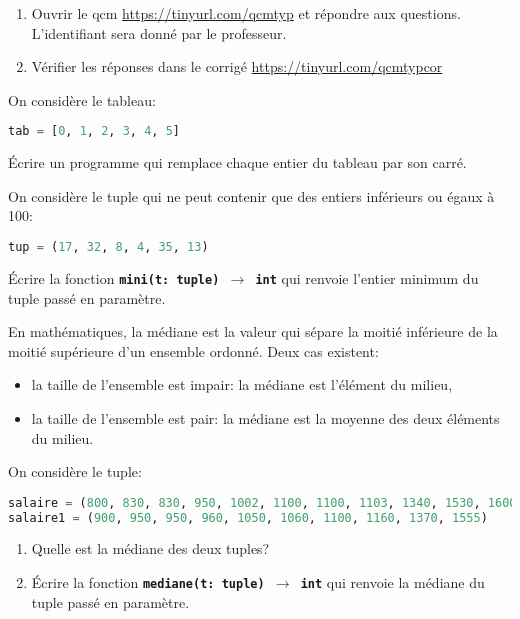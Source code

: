 \documentclass[a4paper,11pt]{article}
\begin{document}
\begin{exo}
\begin{enumerate}
    \item Ouvrir le qcm \url{https://tinyurl.com/qcmtyp} et répondre aux questions. L'identifiant sera donné par le professeur.
    \item Vérifier les réponses dans le corrigé \url{https://tinyurl.com/qcmtypcor}
\end{enumerate}
\end{exo}
\begin{exo}
    On considère le tableau:
    \begin{lstlisting}[language=Python  , xleftmargin=2em, xrightmargin=2em]
tab = [0, 1, 2, 3, 4, 5]
\end{lstlisting}
    Écrire un programme qui remplace chaque entier du tableau par son carré.
\end{exo}
\begin{exo}
    On considère le tuple qui ne peut contenir que des entiers inférieurs ou égaux à 100:
    \begin{lstlisting}[language=Python  , xleftmargin=2em, xrightmargin=2em]
tup = (17, 32, 8, 4, 35, 13)
\end{lstlisting}
    Écrire la fonction \textbf{\texttt{mini(t: tuple) $\rightarrow$ int}} qui renvoie l'entier minimum du tuple passé en paramètre.
\end{exo}
\begin{exo}
    En mathématiques, la médiane est la valeur qui sépare la moitié inférieure de la moitié supérieure d'un ensemble ordonné. Deux cas existent:
    \begin{itemize}
        \item la taille de l'ensemble est impair: la médiane est l'élément du milieu,
        \item la taille de l'ensemble est pair: la médiane est la moyenne des deux éléments du milieu.
    \end{itemize}
    On considère le tuple:
    \begin{lstlisting}[language=Python  , xleftmargin=2em, xrightmargin=2em]
salaire = (800, 830, 830, 950, 1002, 1100, 1100, 1103, 1340, 1530, 1600)
salaire1 = (900, 950, 950, 960, 1050, 1060, 1100, 1160, 1370, 1555)
\end{lstlisting}
    \begin{enumerate}
        \item Quelle est la médiane des deux tuples?
        \item Écrire la fonction \textbf{\texttt{mediane(t: tuple) $\rightarrow$ int}} qui renvoie la médiane du tuple passé en paramètre.
    \end{enumerate}
\end{exo}
\end{document}
